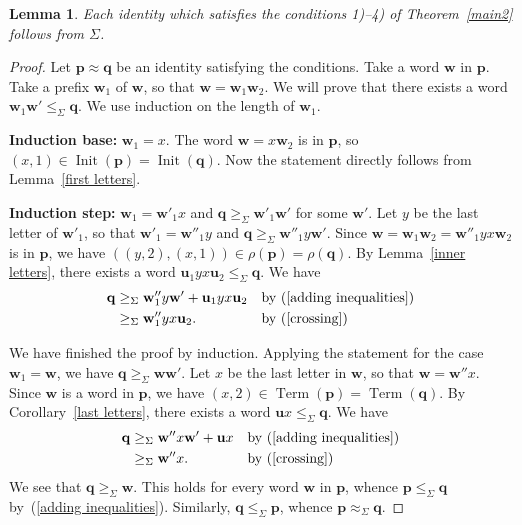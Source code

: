\documentclass[12pt,draft]{amsart}
\newtheorem{lemma}{Lemma}
\DeclareMathOperator{\init}{Init}
\DeclareMathOperator{\term}{Term}
\begin{document}
\begin{lemma}
\label{final} Each identity which satisfies the conditions \textup{1)}--\textup{4)} of Theorem~\textup{\ref{main2}} follows from $\Sigma$.
\end{lemma}
\begin{proof}
Let $\mathbf p\approx\mathbf q$ be an identity satisfying the conditions. Take a word $\mathbf w$ in $\mathbf p$. Take a prefix $\mathbf w_1$ of $\mathbf w$, so that $\mathbf w=\mathbf w_1\mathbf w_2$. We will prove that there exists a word $\mathbf w_1\mathbf w'\le_{\Sigma}\mathbf q$. We use induction on the length of $\mathbf w_1$.

\textbf{Induction base:} $\mathbf w_1=x$. The word $\mathbf w=x\mathbf w_2$ is in $\mathbf p$, so $(x,1)\in\init(\mathbf p)=\init(\mathbf q)$. Now the statement directly follows from Lemma~\ref{first letters}.

\textbf{Induction step:} $\mathbf w_1=\mathbf w'_1x$ and $\mathbf q\ge_{\Sigma}\mathbf w'_1\mathbf w'$ for some $\mathbf w'$. Let $y$ be the last letter of $\mathbf w'_1$, so that $\mathbf w'_1=\mathbf w''_1y$ and $\mathbf q\ge_{\Sigma}\mathbf w''_1y\mathbf w'$. Since $\mathbf w=\mathbf w_1\mathbf w_2=\mathbf w''_1yx\mathbf w_2$ is in $\mathbf p$, we have $((y,2),(x,1))\in\rho(\mathbf p)=\rho(\mathbf q)$. By Lemma~\ref{inner letters}, there exists a word $\mathbf u_1yx\mathbf u_2\le_{\Sigma}\mathbf q$. We have
\begin{align*}
\mathbf q&\ge_{\Sigma}\mathbf w''_1y\mathbf w'+\mathbf u_1yx\mathbf u_2&&\text{by~(\ref{adding inequalities})}\\
&\ge_{\Sigma}\mathbf w''_1yx\mathbf u_2.&&\text{by~(\ref{crossing})}
\end{align*}

We have finished the proof by induction. Applying the statement for the case $\mathbf w_1=\mathbf w$, we have $\mathbf q\ge_{\Sigma}\mathbf w\mathbf w'$. Let $x$ be the last letter in $\mathbf w$, so that $\mathbf w=\mathbf w''x$. Since $\mathbf w$ is a word in $\mathbf p$, we have $(x,2)\in\term(\mathbf p)=\term(\mathbf q)$. By Corollary~\ref{last letters}, there exists a word $\mathbf ux\le_{\Sigma}\mathbf q$. We have
\begin{align*}
\mathbf q&\ge_{\Sigma}\mathbf w''x\mathbf w'+\mathbf ux&&\text{by~(\ref{adding inequalities})}\\
&\ge_{\Sigma}\mathbf w''x.&&\text{by~(\ref{crossing})}
\end{align*}
We see that $\mathbf q\ge_{\Sigma}\mathbf w$. This holds for every word $\mathbf w$ in $\mathbf p$, whence $\mathbf p\le_{\Sigma}\mathbf q$ by~(\ref{adding inequalities}). Similarly, $\mathbf q\le_{\Sigma}\mathbf p$, whence $\mathbf p\approx_{\Sigma}\mathbf q$.
\end{proof}
\end{document}
